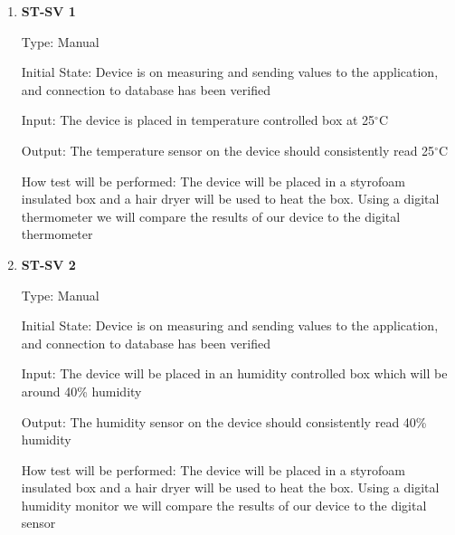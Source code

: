 \documentclass[12pt, titlepage]{article}
\begin{document}
\begin{enumerate}

\item{\bf{ST-SV 1}}

Type: Manual
					
Initial State: Device is on measuring and sending values to the application, and connection to database has been verified
					
Input: The device is placed in temperature controlled box at 25$^{\circ}$C
					
Output: The temperature sensor on the device should consistently read 25$^{\circ}$C

					
How test will be performed: The device will be placed in a styrofoam insulated box and a hair dryer will be used to heat the box. Using a digital thermometer we will compare the results of our device to the digital thermometer\\

		
\item{\bf{ST-SV 2}}

Type: Manual
					
Initial State: Device is on measuring and sending values to the application, and connection to database has been verified
					
Input: The device will be placed in an humidity controlled box which will be around 40\% humidity
					
Output: The humidity sensor on the device should consistently read 40\% humidity

How test will be performed: The device will be placed in a styrofoam insulated box and a hair dryer will be used to heat the box. Using a digital humidity monitor we will compare the results of our device to the digital sensor

\end{enumerate}
\end{document}

